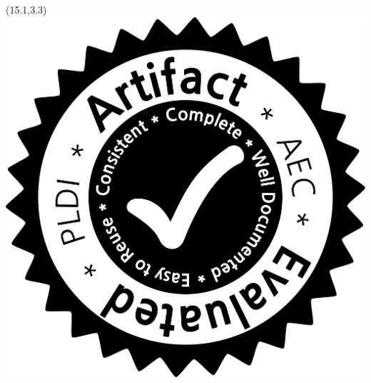\documentclass{sigplanconf1}
\begin{document}
\ifdefined\psflag
\else
  \ifdefined\crflag
  \else 
    \begin{textblock}{2.5}(15.1,3.3)
    \includegraphics[scale=0.1]{aec-badge-pldi.pdf}
    \end{textblock}
  \fi
\fi 

\maketitle
\end{document}
